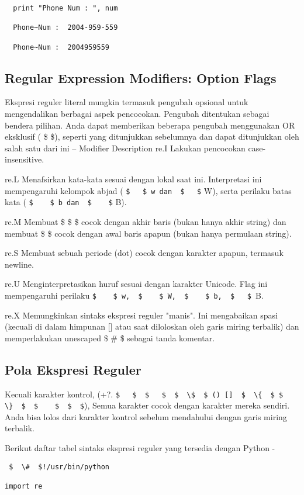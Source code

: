 \begin {enumerate}
\begin {enumerate}
\begin{verbatim}
  print "Phone Num : ", num

  Phone~Num :  2004-959-559

  Phone~Num :  2004959559
  \end{verbatim}

\subsection{Regular Expression Modifiers: Option Flags}
Ekspresi reguler literal mungkin termasuk pengubah opsional untuk mengendalikan berbagai aspek pencocokan. Pengubah ditentukan sebagai bendera pilihan. Anda dapat memberikan beberapa pengubah menggunakan OR eksklusif ( \$   \$), seperti yang ditunjukkan sebelumnya dan dapat ditunjukkan oleh salah satu dari ini – Modifier Description
re.I
Lakukan pencocokan case-insensitive.

re.L
Menafsirkan kata-kata sesuai dengan lokal saat ini. Interpretasi ini mempengaruhi kelompok abjad ( \verb|$   $ w dan  $   $| W), serta perilaku batas kata ( \verb|$    $ b dan  $    $| B).

re.M
Membuat  \$  \$  \$ cocok dengan akhir baris (bukan hanya akhir string) dan membuat  \$   \$ cocok dengan awal baris apapun (bukan hanya permulaan string).

re.S
Membuat sebuah periode (dot) cocok dengan karakter apapun, termasuk newline.

re.U
Menginterpretasikan huruf sesuai dengan karakter Unicode. Flag ini mempengaruhi perilaku  \verb|$    $ w,  $    $ W,  $    $ b,  $   $ |B.

re.X
Memungkinkan sintaks ekspresi reguler "manis". Ini mengabaikan spasi (kecuali di dalam himpunan [] atau saat diloloskan oleh garis miring terbalik) dan memperlakukan unescaped  \$  \#  \$ sebagai tanda komentar.

\subsection{Pola Ekspresi Reguler}
Kecuali karakter kontrol, (+?.  \verb|$   $  $   $  $  \$  $ () []  $  \{  $ $  \}  $  $    $  $  $|), Semua karakter cocok dengan karakter mereka sendiri. Anda bisa lolos dari karakter kontrol sebelum mendahului dengan garis miring terbalik.

Berikut daftar tabel sintaks ekspresi reguler yang tersedia dengan Python -
\begin{verbatim}
 $  \#  $!/usr/bin/python

import re


\end{verbatim}
\end{enumerate}
\end{enumerate}
